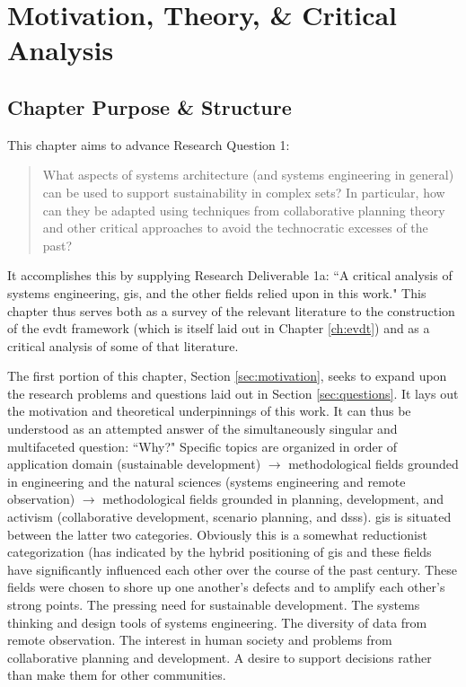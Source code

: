 
\chapter{Motivation, Theory,  \& Critical Analysis} \label{ch:theory}

\section{Chapter Purpose \& Structure}

This chapter aims to advance Research Question 1: 

\blockquote{What aspects of systems architecture (and systems engineering in general) can be used to support sustainability in complex \ac{sets}? In particular, how can they be adapted using techniques from collaborative planning theory and other critical approaches to avoid the technocratic excesses of the past?}

It accomplishes this by supplying Research Deliverable 1a: ``A critical analysis of systems engineering, \acf{gis}, and the other fields relied upon in this work." This chapter thus serves both as a survey of the relevant literature to the construction of the \acf{evdt} framework (which is itself laid out in Chapter \ref{ch:evdt}) and as a critical analysis of some of that literature.

The first portion of this chapter, Section \ref{sec:motivation}, seeks to expand upon the research problems and questions laid out in Section \ref{sec:questions}. It lays out the motivation and theoretical underpinnings of this work. It can thus be understood as an attempted answer of the simultaneously singular and multifaceted question: ``Why?" Specific topics are organized in order of application domain (sustainable development) $\rightarrow$ methodological fields grounded in engineering and the natural sciences (systems engineering and remote observation) $\rightarrow$ methodological fields grounded in planning, development, and activism (collaborative development, scenario planning, and \acfp{dss}). \ac{gis} is situated between the latter two categories. Obviously this is a somewhat reductionist categorization (has indicated by the hybrid positioning of \ac{gis} and these fields have significantly influenced each other over the course of the past century. These fields were chosen to shore up one another's defects and to amplify each other's strong points. The pressing need for sustainable development. The systems thinking and design tools of systems engineering. The diversity of data from remote observation. The interest in human society and problems from collaborative planning and development. A desire to support decisions rather than make them for other communities.

